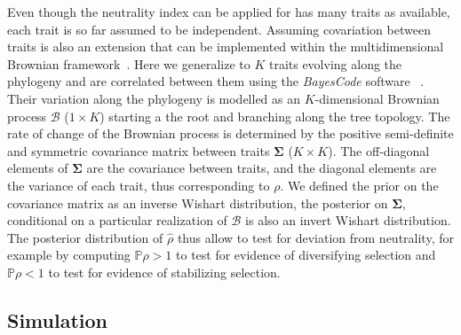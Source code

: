 \documentclass{article}
\newcommand{\UniDimArray}[1]{\bm{#1}}
\newcommand{\BiDimArray}[1]{\bm{#1}}
\newcommand{\proba}{\mathbb{P}}
\newcommand{\NI}{\rho}
\newcommand{\EstNI}{\widehat{\rho}}
\newcommand{\Ntrait}{K}
\newcommand{\Covariancematrix}{\Sigma}
\newcommand{\CovarianceMatrix}{\BiDimArray{\Covariancematrix}}
\newcommand{\brownian}{\mathcal{B}}
\newcommand{\Brownian}{\UniDimArray{\brownian}}
\begin{document}
Even though the neutrality index can be applied for has many traits as available, each trait is so far assumed to be independent.
Assuming covariation between traits is also an extension that can be implemented within the multidimensional Brownian framework~\cite{huelsenbeck_detecting_2003, lartillot_phylogenetic_2011, lartillot_joint_2012, latrille_inferring_2021}.
Here we generalize to $\Ntrait$ traits evolving along the phylogeny and are correlated between them using the \textit{BayesCode} software~\cite{latrille_inferring_2021} .
Their variation along the phylogeny is modelled as an $\Ntrait$-dimensional Brownian process $\Brownian$ ($1 \times \Ntrait$) starting a the root and branching along the tree topology.
The rate of change of the Brownian process is determined by the positive semi-definite and symmetric covariance matrix between traits $\CovarianceMatrix$ ($\Ntrait \times \Ntrait$).
The off-diagonal elements of $\CovarianceMatrix$ are the covariance between traits, and the diagonal elements are the variance of each trait, thus corresponding to $\NI$.
We defined the {prior} on the covariance matrix as an inverse Wishart distribution, the {posterior} on $\CovarianceMatrix$, conditional on a particular realization of $\brownian$ is also an invert Wishart distribution.
The posterior distribution of $\EstNI$ thus allow to test for deviation from neutrality, for example by computing $\proba{\NI > 1 }$ to test for evidence of diversifying selection and $\proba{\NI < 1 }$ to test for evidence of stabilizing selection.

\subsection{Simulation}\label{subsec:simulations}
\end{document}
